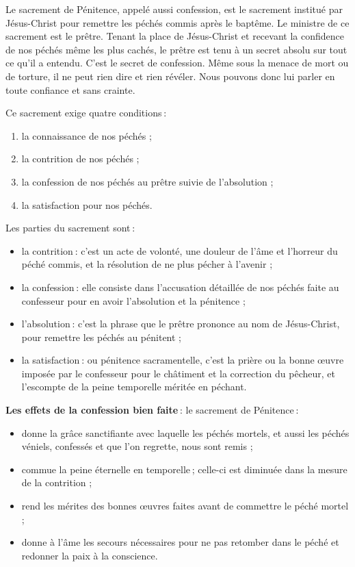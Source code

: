 \clearpage
{}

Le sacrement de Pénitence, appelé aussi confession, est le sacrement institué par Jésus-Christ pour remettre les péchés commis après le baptême. Le ministre de ce sacrement est le prêtre. Tenant la place de Jésus-Christ et recevant la confidence de nos péchés même les plus cachés, le prêtre est tenu à un secret absolu sur tout ce qu’il a entendu. C’est le secret de confession. Même sous la menace de mort ou de torture, il ne peut rien dire et rien révéler. Nous pouvons donc lui parler en toute confiance et sans crainte.

Ce sacrement exige quatre conditions :
\begin{enumerate}
\item la connaissance de nos péchés ;
\item la contrition de nos péchés ;
\item la confession de nos péchés au prêtre suivie de l’absolution ;
\item la satisfaction pour nos péchés.
\end{enumerate}

\smallskip
Les parties du sacrement sont :
\begin{itemize}
\item la contrition : c’est un acte de volonté, une douleur de l’âme et l’horreur du péché commis, et la résolution de ne plus pécher à l’avenir ;
\item la confession : elle consiste dans l’accusation détaillée de nos péchés faite au confesseur pour en avoir l’absolution et la pénitence ;
\item l'absolution : c’est la phrase que le prêtre prononce au nom de Jésus-Christ, pour remettre les péchés au pénitent ;
\item la satisfaction : ou pénitence sacramentelle, c’est la prière ou la bonne œuvre imposée par le confesseur pour le châtiment et la correction du pêcheur, et l’escompte de la peine temporelle méritée en péchant.
\end{itemize}

\smallskip
\textbf{Les effets de la confession bien faite} : le sacrement de Pénitence :
\begin{itemize}
\item donne la grâce sanctifiante avec laquelle les péchés mortels, et aussi les péchés véniels, confessés et que l'on regrette, nous sont remis ;
\item commue la peine éternelle en temporelle ; celle-ci est diminuée dans la mesure de la contrition ;
\item rend les mérites des bonnes œuvres faites avant de commettre le péché
mortel ;
\item donne à l’âme les secours nécessaires pour ne pas retomber dans le péché et redonner la paix à la conscience.
\end{itemize}

